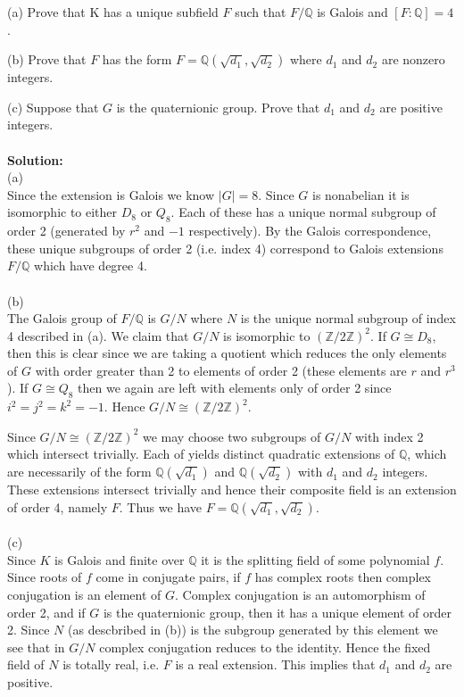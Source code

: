 \documentclass[11pt]{article}
\newcommand{\Z}{\mathbb{Z}}
\newcommand{\Q}{\mathbb{Q}}
\begin{document}
(a) Prove that K has a unique subfield $F$ such that $F/\Q$ is Galois and $[F : \Q] = 4$.

(b) Prove that $F$ has the form $F =\Q(\sqrt{d_1},\sqrt{d_2})$ where $d_1$ and $d_2$ are nonzero integers.

(c) Suppose that $G$ is the quaternionic group. Prove that $d_1$ and $d_2$ are positive integers.\\\\
\textbf{Solution:}\\
(a)\\
Since the extension is Galois we know $|G| = 8$. Since $G$ is nonabelian it is isomorphic to either $D_8$ or $Q_8$. Each of these has a unique normal subgroup of order 2 (generated by $r^2$ and $-1$ respectively). By the Galois correspondence, these unique subgroups of order 2 (i.e. index 4) correspond to Galois extensions $F/\Q$ which have degree 4. \\\\
(b)\\
The Galois group of $F/\Q$ is $G/N$ where $N$ is the unique normal subgroup of index 4 described in (a). We claim that $G/N$ is isomorphic to $(\Z/2\Z)^2$. If $G\cong D_8$, then this is clear since we are taking a quotient which reduces the only elements of $G$ with order greater than 2 to elements of order 2 (these elements are $r$ and $r^3$). If $G\cong Q_8$ then we again are left with elements only of order 2 since $i^2 = j^2 = k^2 = -1$. Hence $G/N \cong (\Z/2\Z)^2$. 

Since $G/N \cong (\Z/2\Z)^2$ we may choose two subgroups of $G/N$ with index 2 which intersect trivially. Each of yields distinct quadratic extensions of $\Q$, which are necessarily of the form $\Q(\sqrt{d_1})$ and $\Q(\sqrt{d_2})$ with $d_1$ and $d_2$ integers. These extensions intersect trivially and hence their composite field is an extension of order 4, namely $F$. Thus we have $F = \Q(\sqrt{d_1},\sqrt{d_2})$. \\\\
(c)\\
Since $K$ is Galois and finite over $\Q$ it is the splitting field of some polynomial $f$. Since roots of $f$ come in conjugate pairs, if $f$ has complex roots then complex conjugation is an element of $G$. Complex conjugation is an automorphism of order 2, and if $G$ is the quaternionic group, then it has a unique element of order 2. Since $N$ (as descbribed in (b)) is the subgroup generated by this element we see that in $G/N$ complex conjugation reduces to the identity. Hence the fixed field of $N$ is totally real, i.e. $F$ is a real extension. This implies that $d_1$ and $d_2$ are positive. 
\newpage 
\end{document}
